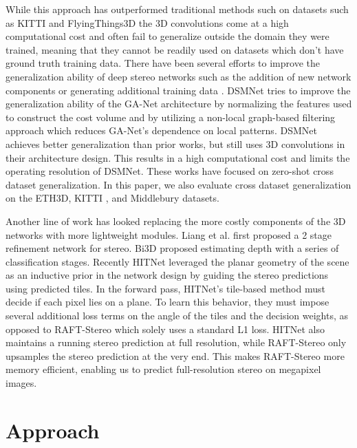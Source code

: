 \documentclass[10pt,twocolumn,letterpaper]{article}
\begin{document}
While this approach has outperformed traditional methods such on datasets such as KITTI\cite{kitti} and FlyingThings3D\cite{sceneflow} the 3D convolutions come at a high computational cost and often fail to generalize outside the domain they were trained, meaning that they cannot be readily used on datasets which don't have ground truth training data. There have been several efforts to improve the generalization ability of deep stereo networks such as the addition of new network components\cite{dsmnet} or generating additional training data \cite{watson2020learning}. DSMNet \cite{dsmnet} tries to improve the generalization ability of the GA-Net architecture by normalizing the features used to construct the cost volume and by utilizing a non-local graph-based filtering approach which reduces GA-Net's dependence on local patterns. DSMNet achieves better generalization than prior works, but still uses 3D convolutions in their architecture design. This results in a high computational cost and limits the operating resolution of DSMNet. These works have focused on zero-shot cross dataset generalization. In this paper, we also evaluate cross dataset generalization on the ETH3D\cite{eth3d}, KITTI \cite{kitti}, and Middlebury \cite{middlebury} datasets.

Another line of work has looked replacing the more costly components of the 3D networks with more lightweight modules. Liang et al. \cite{liang2018learning} first proposed a 2 stage refinement network for stereo. Bi3D \cite{badki2020bi3d} proposed estimating depth with a series of classification stages. Recently HITNet \cite{tankovich2020hitnet} leveraged the planar geometry of the scene as an inductive prior in the network design by guiding the stereo predictions using predicted tiles. In the forward pass, HITNet's tile-based method must decide if each pixel lies on a plane. To learn this behavior, they must impose several additional loss terms on the angle of the tiles and the decision weights, as opposed to RAFT-Stereo which solely uses a standard L1 loss. HITNet also maintains a running stereo prediction at full resolution, while RAFT-Stereo only upsamples the stereo prediction at the very end. This makes RAFT-Stereo more memory efficient, enabling us to predict full-resolution stereo on megapixel images.







\section{Approach}
\end{document}
